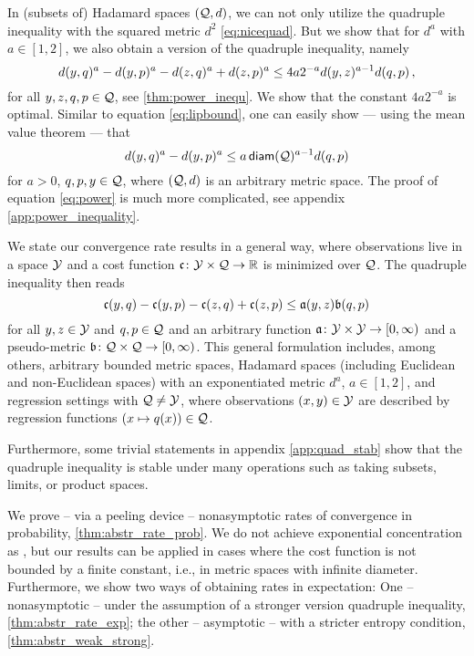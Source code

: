 In (subsets of) Hadamard spaces $(\mathcal{Q}, d)$, we can not only utilize the quadruple inequality with the squared metric $d^2$ \eqref{eq:nicequad}. But we show that for $d^a$ with $a \in [1,2]$, we also obtain a version of the quadruple inequality, namely
\begin{equation}\label{eq:power}
	d(y,q)^a - d(y,p)^a - d(z,q)^a + d(z,p)^a \leq  4a 2^{-a} d(y, z)^{a-1} d(q, p)
	\, ,
\end{equation}
for all $y,z,q, p \in \mathcal{Q}$, see \autoref{thm:power_inequ}.
We show that the constant $4a 2^{-a}$ is optimal.
Similar to equation \eqref{eq:lipbound}, one can easily show --- using the mean value theorem --- that 
\begin{equation*}
	d(y,q)^a - d(y,p)^a \leq  a \operatorname{\mathsf{diam}}(\mathcal{Q})^{a-1} d(q, p)
\end{equation*}
for $a > 0$, $q,p,y\in\mathcal{Q}$, where $(\mathcal{Q}, d)$ is an arbitrary metric space. The proof of equation \eqref{eq:power} is much more complicated, see appendix \autoref{app:power_inequality}.

We state our convergence rate results in a general way, where observations live in a space $\mathcal{Y}$ and a cost function $\mathfrak{c} \colon \mathcal{Y} \times \mathcal{Q} \to \mathbb{R}$ is minimized over $\mathcal{Q}$. The quadruple inequality then reads
\begin{equation*}
	\mathfrak{c}(y,q) - \mathfrak{c}(y,p) - \mathfrak{c}(z,q) + \mathfrak{c}(z,p) \leq  \mathfrak{a}(y, z) \mathfrak{b}(q, p)
\end{equation*}
for all $y,z \in \mathcal{Y}$ and $q, p \in \mathcal{Q}$ and an arbitrary function $\mathfrak{a} \colon \mathcal{Y} \times \mathcal{Y} \to [0,\infty)$ and a pseudo-metric $\mathfrak{b} \colon \mathcal{Q} \times \mathcal{Q} \to [0,\infty)$. This general formulation includes, among others, arbitrary bounded metric spaces, Hadamard spaces (including Euclidean and non-Euclidean spaces) with an exponentiated metric $d^a$, $a\in[1,2]$, and regression settings with $\mathcal{Q} \neq \mathcal{Y}$, where observations $(x,y) \in \mathcal{Y}$ are described by regression functions $(x \mapsto q(x)) \in \mathcal{Q}$.

Furthermore, some trivial statements in appendix \autoref{app:quad_stab} show that the quadruple inequality is stable under many operations such as taking subsets, limits, or product spaces.

We prove -- via a peeling device -- nonasymptotic rates of convergence in probability, \autoref{thm:abstr_rate_prob}. We do not achieve exponential concentration as \cite{legouic18}, but our results can be applied in cases where the cost function is not bounded by a finite constant, i.e., in metric spaces with infinite diameter. Furthermore, we show two ways of obtaining rates in expectation: One -- nonasymptotic -- under the assumption of a stronger version quadruple inequality, \autoref{thm:abstr_rate_exp}; the other -- asymptotic -- with a stricter entropy condition, \autoref{thm:abstr_weak_strong}.

